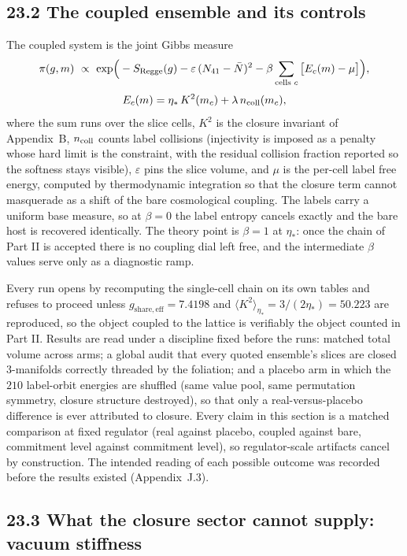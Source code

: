\documentclass[11pt]{article}
\begin{document}
\subsection{23.2 The coupled ensemble and its controls}

The coupled system is the joint Gibbs measure
\[
\pi(g,m)\ \propto\ \exp\!\Big(-S_{\rm Regge}(g)-\varepsilon\,(N_{41}-\bar N)^2-\beta\sum_{\text{cells }c}\big[E_c(m)-\mu\big]\Big),
\]
\[
E_c(m)=\eta_*\,K^2(m_c)+\lambda\,n_{\rm coll}(m_c),
\]
where the sum runs over the slice cells, $K^2$ is the closure invariant of Appendix~B, $n_{\rm coll}$ counts label collisions (injectivity is imposed as a penalty whose hard limit is the constraint, with the residual collision fraction reported so the softness stays visible), $\varepsilon$ pins the slice volume, and $\mu$ is the per-cell label free energy, computed by thermodynamic integration so that the closure term cannot masquerade as a shift of the bare cosmological coupling. The labels carry a uniform base measure, so at $\beta=0$ the label entropy cancels exactly and the bare host is recovered identically. The theory point is $\beta=1$ at $\eta_*$: once the chain of Part II is accepted there is no coupling dial left free, and the intermediate $\beta$ values serve only as a diagnostic ramp.

Every run opens by recomputing the single-cell chain on its own tables and refuses to proceed unless $g_{\mathrm{share,eff}}=7.4198$ and $\langle K^2\rangle_{\eta_*}=3/(2\eta_*)=50.223$ are reproduced, so the object coupled to the lattice is verifiably the object counted in Part II. Results are read under a discipline fixed before the runs: matched total volume across arms; a global audit that every quoted ensemble's slices are closed $3$-manifolds correctly threaded by the foliation; and a placebo arm in which the $210$ label-orbit energies are shuffled (same value pool, same permutation symmetry, closure structure destroyed), so that only a real-versus-placebo difference is ever attributed to closure. Every claim in this section is a matched comparison at fixed regulator (real against placebo, coupled against bare, commitment level against commitment level), so regulator-scale artifacts cancel by construction. The intended reading of each possible outcome was recorded before the results existed (Appendix~J.3).

\subsection{23.3 What the closure sector cannot supply: vacuum stiffness}
\end{document}
